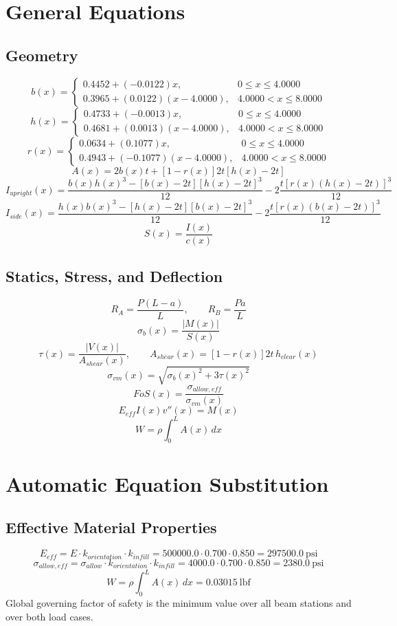 \documentclass[11pt]{article}
\begin{document}
\section*{General Equations}
\subsection*{Geometry}
\[
b(x)=\begin{cases}0.4452 + (-0.0122)x, & 0 \le x \le 4.0000\\0.3965 + (0.0122)(x-4.0000), & 4.0000 < x \le 8.0000\end{cases}
\]
\[
h(x)=\begin{cases}0.4733 + (-0.0013)x, & 0 \le x \le 4.0000\\0.4681 + (0.0013)(x-4.0000), & 4.0000 < x \le 8.0000\end{cases}
\]
\[
r(x)=\begin{cases}0.0634 + (0.1077)x, & 0 \le x \le 4.0000\\0.4943 + (-0.1077)(x-4.0000), & 4.0000 < x \le 8.0000\end{cases}
\]
\[
A(x)=2b(x)t+[1-r(x)]2t[h(x)-2t]
\]
\[
I_{upright}(x)=\frac{b(x)h(x)^3-[b(x)-2t][h(x)-2t]^3}{12}-2\frac{t[r(x)(h(x)-2t)]^3}{12}
\]
\[
I_{side}(x)=\frac{h(x)b(x)^3-[h(x)-2t][b(x)-2t]^3}{12}-2\frac{t[r(x)(b(x)-2t)]^3}{12}
\]
\[
S(x)=\frac{I(x)}{c(x)}
\]

\subsection*{Statics, Stress, and Deflection}
\[
R_A=\frac{P(L-a)}{L}, \qquad R_B=\frac{Pa}{L}
\]
\[
\sigma_b(x)=\frac{|M(x)|}{S(x)}
\]
\[
\tau(x)=\frac{|V(x)|}{A_{shear}(x)}, \qquad A_{shear}(x)=[1-r(x)]2t\,h_{clear}(x)
\]
\[
\sigma_{vm}(x)=\sqrt{\sigma_b(x)^2+3\tau(x)^2}
\]
\[
FoS(x)=\frac{\sigma_{allow,eff}}{\sigma_{vm}(x)}
\]
\[
E_{eff}I(x)v''(x)=M(x)
\]
\[
W=\rho\int_0^L A(x)\,dx
\]

\section*{Automatic Equation Substitution}
\subsection*{Effective Material Properties}
\[E_{eff} = E \cdot k_{orientation} \cdot k_{infill} = 500000.0 \cdot 0.700 \cdot 0.850 = 297500.0\ \mathrm{psi}\]
\[\sigma_{allow,eff} = \sigma_{allow} \cdot k_{orientation} \cdot k_{infill} = 4000.0 \cdot 0.700 \cdot 0.850 = 2380.0\ \mathrm{psi}\]
\[W = \rho \int_0^L A(x)\,dx = 0.03015\ \mathrm{lbf}\]
Global governing factor of safety is the minimum value over all beam stations and over both load cases.
\end{document}
